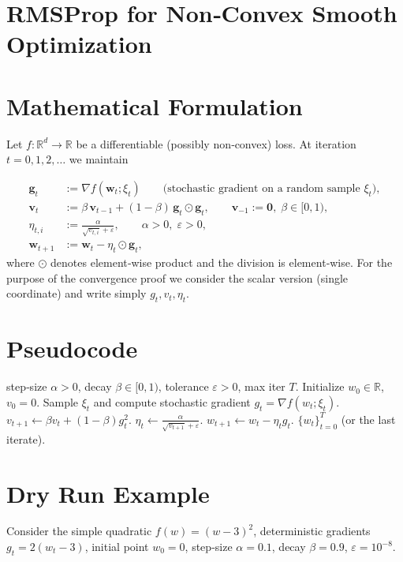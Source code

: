 \documentclass{article}
\newcommand{\R}{\mathbb{R}}
\begin{document}
\section*{RMSProp for Non‑Convex Smooth Optimization}

\section*{Mathematical Formulation}
Let $f:\R^{d}\to\R$ be a differentiable (possibly non‑convex) loss.  
At iteration $t=0,1,2,\dots$ we maintain  

\[
\begin{aligned}
\mathbf{g}_{t} &:= \nabla f(\mathbf{w}_{t};\xi_{t}) \qquad\text{(stochastic gradient on a random sample }\xi_{t}),\\[4pt]
\mathbf{v}_{t} &:= \beta\,\mathbf{v}_{t-1}+(1-\beta)\,\mathbf{g}_{t}\odot\mathbf{g}_{t},
\qquad \mathbf{v}_{-1}:=\mathbf{0},\; \beta\in[0,1),\\[4pt]
\eta_{t,i} &:= \frac{\alpha}{\sqrt{v_{t,i}}+\varepsilon},
\qquad \alpha>0,\;\varepsilon>0,\\[4pt]
\mathbf{w}_{t+1} &:= \mathbf{w}_{t}-\eta_{t}\odot\mathbf{g}_{t},
\end{aligned}
\]
where $\odot$ denotes element‑wise product and the division is element‑wise.  
For the purpose of the convergence proof we consider the scalar version (single coordinate) and write simply $g_{t},v_{t},\eta_{t}$.

\section*{Pseudocode}
\begin{algorithm}[H]
\caption{RMSProp (scalar version)}
\begin{algorithmic}[1]
 step‑size $\alpha>0$, decay $\beta\in[0,1)$, tolerance $\varepsilon>0$, max iter $T$.
\State Initialize $w_{0}\in\R$, $v_{0}=0$.
    \State Sample $\xi_{t}$ and compute stochastic gradient $g_{t}= \nabla f(w_{t};\xi_{t})$.
    \State $v_{t+1}\gets \beta v_{t}+(1-\beta)g_{t}^{2}$.
    \State $\eta_{t}\gets \displaystyle\frac{\alpha}{\sqrt{v_{t+1}}+\varepsilon}$.
    \State $w_{t+1}\gets w_{t}-\eta_{t} g_{t}$.
\EndFor
{} $\{w_{t}\}_{t=0}^{T}$ (or the last iterate).
\end{algorithmic}
\end{algorithm}

\section*{Dry Run Example}
Consider the simple quadratic $f(w)=(w-3)^{2}$, deterministic gradients $g_{t}=2(w_{t}-3)$,  
initial point $w_{0}=0$, step‑size $\alpha=0.1$, decay $\beta=0.9$, $\varepsilon=10^{-8}$.
\end{document}
